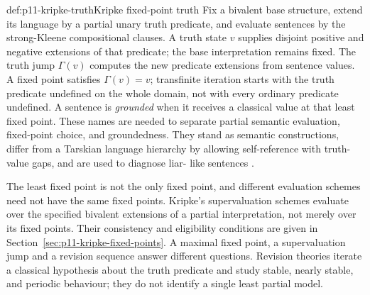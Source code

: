 \begin{hbdefinition}{def:p11-kripke-truth}{Kripke fixed-point truth}
Fix a bivalent base structure, extend its language by a partial unary truth
predicate, and evaluate sentences by the strong-Kleene compositional clauses.
A truth state \(v\) supplies disjoint positive and negative extensions of
that predicate; the base interpretation remains fixed. The truth jump
\(\Gamma(v)\) computes the new predicate extensions from sentence values.
A fixed point satisfies \(\Gamma(v)=v\); transfinite iteration starts with
the truth predicate undefined on the whole domain, not with every ordinary
predicate undefined. A sentence is \emph{grounded} when it receives a
classical value at that least fixed point. These names are needed to separate
partial semantic evaluation, fixed-point choice, and groundedness. They stand
as semantic constructions, differ from a Tarskian language hierarchy by
allowing self-reference with truth-value gaps, and are used to diagnose liar-
like sentences \cite{Kripke1975,Martin1984}.
\end{hbdefinition}

The least fixed point is not the only fixed point, and different evaluation
schemes need not have the same fixed points. Kripke's supervaluation schemes
evaluate over the specified bivalent extensions of a partial interpretation,
not merely over its fixed points. Their consistency and eligibility conditions
are given in Section~\ref{sec:p11-kripke-fixed-points}. A maximal fixed
point, a supervaluation jump and a revision sequence answer different
questions. Revision theories iterate a classical hypothesis about
the truth predicate and study stable, nearly stable, and periodic behaviour;
they do not identify a single least partial model.

